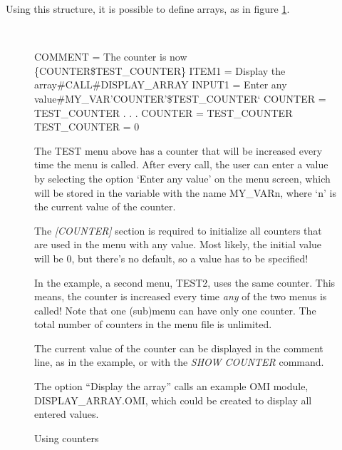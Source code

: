 \documentclass[a4paper]{book}
\renewcommand{\indent}{\hspace*{5mm}}
\begin{document}
Using this structure, it is possible to define arrays, as in figure \ref{fig:counter}.

\begin{figure}[ht]
\begin{minipage}[t]{\textwidth}
\hrulefill \\
\begin{ttfamily}
 \newline
\indent COMMENT = The counter is now {\{}COUNTER{\$}TEST{\_}COUNTER{\}} \newline
\indent ITEM1 = Display the array{\#}CALL{\#}DISPLAY{\_}ARRAY \newline
\indent INPUT1 = Enter any value{\#}MY{\_}VAR'COUNTER'{\$}TEST{\_}COUNTER` \newline
\indent COUNTER = TEST{\_}COUNTER \newline
 \newline
{} \newline
\indent . \newline
\indent . \newline
\indent . \newline
\indent COUNTER = TEST{\_}COUNTER \newline
 \newline
\noindent[COUNTER] \newline
\indent TEST{\_}COUNTER = 0 \newline
\end{ttfamily}

\noindent The TEST menu above has a counter that will be increased every time the menu 
is called. After every call, the user can enter a value by selecting the 
option `Enter any value' on the menu screen, which will be stored in the 
variable with the name MY{\_}VARn, where `n' is the current value of the 
counter.

The \textsl{[COUNTER]} section is required to initialize all counters that are used in the 
menu with any value. Most likely, the initial value will be 0, but there's 
no default, so a value has to be specified!

In the example, a second menu, TEST2, uses the same counter. This means, the 
counter is increased every time \textit{any} of the two menus is called! Note that 
one (sub)menu can have only one counter. The total number of counters in the 
menu file is unlimited.

The current value of the counter can be displayed in the comment line, as in 
the example, or with the \textsl{SHOW COUNTER} 
command.

The option ``Display the array'' calls an example OMI module, 
DISPLAY{\_}ARRAY.OMI, which could be created to display all entered values.
\caption{Using counters}\label{fig:counter}
\hrulefill
\end{minipage}
\end{figure}
\end{document}
